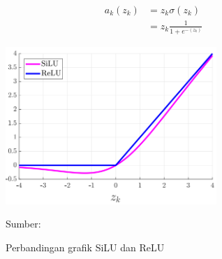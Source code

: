     \begin{align}
        \label{eq:silu}
        a_k(z_k) &= z_k\sigma (z_k)\nonumber\\
        &= z_k\frac{1}{1+e^{-(z_k)}}
    \end{align}

    \begin{figure}[H]
        \begin{center}
            \includegraphics[width=8cm]{img/bab2/silu.PNG}
            \caption{Perbandingan grafik SiLU dan ReLU}
            \label{fig:silu}
            Sumber: \citep{Elfwing2018}
        \end{center}
    \end{figure}


